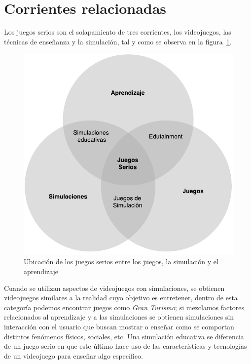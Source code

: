 \section{Corrientes relacionadas}

Los juegos serios son el solapamiento de tres corrientes, los videojuegos, las
técnicas de enseñanza y la simulación\cite{education:games}, tal y
como se observa en la figura~\ref{fig:corrientes_relacionadas}. 

\begin{figure}[ht]
\centering
\includegraphics[scale=0.5]{juegos_serios/corrientes_paralelas.pdf}
\caption{Ubicación de los juegos serios entre los juegos, la simulación y
    el aprendizaje}
\label{fig:corrientes_relacionadas}
\end{figure}

Cuando se utilizan aspectos de videojuegos con simulaciones, se obtienen videojuegos 
similares a la realidad cuyo objetivo es entretener, dentro de esta
categoría podemos encontrar juegos como \emph{Gran Turismo}; si mezclamos
factores relacionados al aprendizaje y a las simulaciones se obtienen
simulaciones sin interacción con el usuario que buscan mostrar o enseñar como se
comportan distintos fenómenos físicos, sociales, etc. Una simulación educativa se 
diferencia de un juego serio en que este último hace uso de las características y 
tecnologías de un videojuego para enseñar algo específico. 

